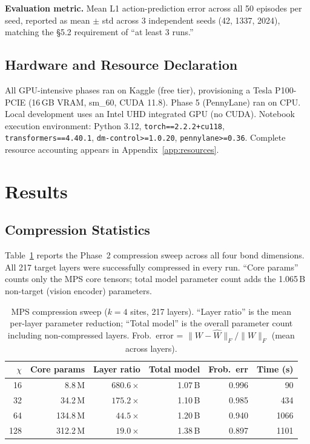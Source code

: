 \documentclass[10pt,twocolumn]{article}
\begin{document}
\textbf{Evaluation metric.} Mean L1 action-prediction error across all 50 episodes
per seed, reported as mean $\pm$ std across 3 independent seeds (42, 1337, 2024),
matching the \S5.2 requirement of ``at least 3 runs.''

\subsection{Hardware and Resource Declaration}
\label{sec:hardware}

All GPU-intensive phases ran on Kaggle (free tier), provisioning a Tesla P100-PCIE
(16\,GB VRAM, sm\_60, CUDA 11.8). Phase 5 (PennyLane) ran on CPU. Local
development uses an Intel UHD integrated GPU (no CUDA). Notebook execution
environment: Python 3.12, \texttt{torch==2.2.2+cu118},
\texttt{transformers==4.40.1}, \texttt{dm-control>=1.0.20}, \texttt{pennylane>=0.36}.
Complete resource accounting appears in Appendix~\ref{app:resources}.

\section{Results}

\subsection{Compression Statistics}

Table~\ref{tab:compression} reports the Phase~2 compression sweep across all four
bond dimensions. All 217 target layers were successfully compressed in every run.
``Core params'' counts only the MPS core tensors; total model parameter count adds
the 1.065\,B non-target (vision encoder) parameters.

\begin{table}[t]
\centering
\small
\caption{MPS compression sweep ($k=4$ sites, 217 layers). ``Layer ratio'' is the
  mean per-layer parameter reduction; ``Total model'' is the overall parameter count
  including non-compressed layers. Frob.\ error = $\|W - \hat{W}\|_F / \|W\|_F$
  (mean across layers).}
\label{tab:compression}
\begin{tabular}{rrrrrr}
\toprule
$\chi$ & Core params & Layer ratio & Total model & Frob.\ err & Time (s) \\
\midrule
16  & 8.8\,M   & $680.6\times$ & 1.07\,B & 0.996 & 90 \\
32  & 34.2\,M  & $175.2\times$ & 1.10\,B & 0.985 & 434 \\
64  & 134.8\,M & $44.5\times$  & 1.20\,B & 0.940 & 1066 \\
128 & 312.2\,M & $19.0\times$  & 1.38\,B & 0.897 & 1101 \\
\bottomrule
\end{tabular}
\end{table}
\end{document}
